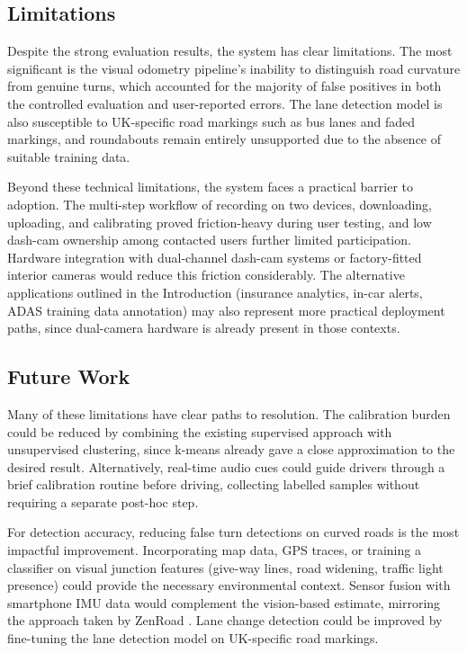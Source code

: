 \documentclass{article}
\begin{document}
\subsection{Limitations} %
Despite the strong evaluation results, the system has clear limitations. The most significant is the visual odometry pipeline's inability to distinguish road curvature from genuine turns, which accounted for the majority of false positives in both the controlled evaluation and user-reported errors. The lane detection model is also susceptible to UK-specific road markings such as bus lanes and faded markings, and roundabouts remain entirely unsupported due to the absence of suitable training data.

Beyond these technical limitations, the system faces a practical barrier to adoption. The multi-step workflow of recording on two devices, downloading, uploading, and calibrating proved friction-heavy during user testing, and low dash-cam ownership among contacted users further limited participation. Hardware integration with dual-channel dash-cam systems \cite{viofo_a229plus} or factory-fitted interior cameras \cite{jlr_dms_news} would reduce this friction considerably. The alternative applications outlined in the Introduction (insurance analytics, in-car alerts, ADAS training data annotation) may also represent more practical deployment paths, since dual-camera hardware is already present in those contexts.

\subsection{Future Work}
Many of these limitations have clear paths to resolution. The calibration burden could be reduced by combining the existing supervised approach with unsupervised clustering, since k-means already gave a close approximation to the desired result. Alternatively, real-time audio cues could guide drivers through a brief calibration routine before driving, collecting labelled samples without requiring a separate post-hoc step.

For detection accuracy, reducing false turn detections on curved roads is the most impactful improvement. Incorporating map data, GPS traces, or training a classifier on visual junction features (give-way lines, road widening, traffic light presence) could provide the necessary environmental context. Sensor fusion with smartphone IMU data would complement the vision-based estimate, mirroring the approach taken by ZenRoad \cite{zenroad_app}. Lane change detection could be improved by fine-tuning the lane detection model on UK-specific road markings.
\end{document}
